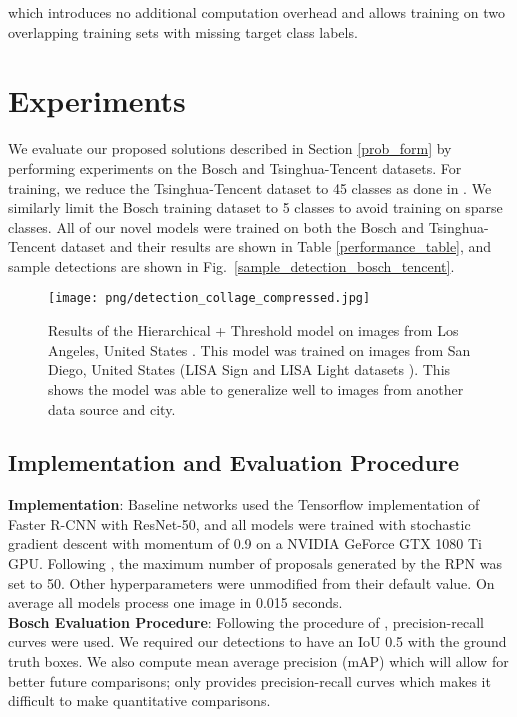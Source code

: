 \documentclass[10pt, conference, compsocconf]{IEEEtran}
\newcommand{\fig}[1]{Fig.~\ref{#1}}
\begin{document}
which introduces no additional computation overhead and allows training on two overlapping training sets with missing target class labels.

\section{Experiments} \label{experiments}

We evaluate our proposed solutions described in Section \ref{prob_form} by performing experiments on the Bosch and Tsinghua-Tencent datasets. For training, we reduce the Tsinghua-Tencent dataset to 45 classes as done in \cite{tencent,perceptual_gan, meng}. We similarly limit the Bosch training dataset to 5 classes to avoid training on sparse classes. All of our novel models were trained on both the Bosch and Tsinghua-Tencent dataset and their results are shown in Table \ref{performance_table}, and sample detections are shown in \fig{sample_detection_bosch_tencent}.

\begin{figure*}[t]
    \begin{center}
    \texttt{[image: png/detection\_collage\_compressed.jpg]}
    \end{center}
    \caption{Results of the Hierarchical + Threshold model on images from Los Angeles, United States \cite{la_video}. This model was trained on images from San Diego, United States (LISA Sign \cite{lisa_signs} and LISA Light datasets \cite{lisa1,lisa2}). This shows the model was able to generalize well to images from another data source and city.}
    \label{sample_detection_la}
\end{figure*}

\subsection{Implementation and Evaluation Procedure}

\noindent\textbf{Implementation}:  Baseline networks used the Tensorflow \cite{abadi2016} implementation of Faster R-CNN with ResNet-50, and all models were trained with stochastic gradient descent with momentum of 0.9 on a NVIDIA GeForce GTX 1080 Ti GPU. Following \cite{huang2016}, the maximum number of proposals generated by the RPN was set to 50. Other hyperparameters were unmodified from their default value. On average all models process one image in 0.015 seconds. \\

\noindent\textbf{Bosch Evaluation Procedure}: Following the procedure of \cite{behrendt2017}, precision-recall curves were used. We required our detections to have an IoU  0.5 with the ground truth boxes. We also compute mean average precision (mAP) which will allow for better future comparisons; \cite{behrendt2017} only provides precision-recall curves which makes it difficult to make quantitative comparisons. \\
\end{document}
